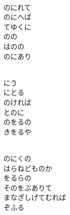 \documentclass[10pt,b5j]{tarticle} %
\begin{document}
\vspace{1.5em} %
\newcommand{\linespace}{0.5em} %
\newcommand{\blocksize}{0.5\hsize} %
\newcommand{\itemmargin}{3em} %
\begin{enumerate} %
    \setlength{\itemindent}{\itemmargin} %
    \begin{minipage}[c]{\blocksize}
    
        \vspace{\linespace}
        \item~\\
        のにれて\\
        のにへば\\
        てゆくに\\
        のの\\
        はのの\\
        のにあり
        
    \end{minipage}
    \begin{minipage}[c]{\blocksize}
        
        \vspace{\linespace}
        \item~\\
        にう\\
        にとる\\
        のければ\\
        とのに\\
        のをるの\\
        きをるや
        
    \end{minipage}
    \begin{minipage}[c]{\blocksize}
        
        \vspace{\linespace}
        \item~\\
        のにくの\\
        はらねどものか\\
        をるらの\\
        そのをぶありて\\
        まなざしげてむれば\\
        ぞふる
    
    \end{minipage}
\end{enumerate} %
\end{document}
